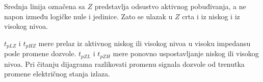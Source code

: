 Srednja linija označena sa $Z$ predstavlja odsustvo aktivnog pobuđivanja, a ne napon između logičke nule i jedinice. Zato se ulazak u $Z$ crta i iz niskog i iz visokog nivoa.

$t_{pLZ}$ i $t_{pHZ}$ mere prelaz iz aktivnog niskog ili visokog nivoa u visoku impedansu posle promene dozvole. $t_{pZL}$ i $t_{pZH}$ mere ponovno uspostavljanje niskog ili visokog nivoa. Pri čitanju dijagrama razlikovati promenu signala dozvole od trenutka promene električnog stanja izlaza.
